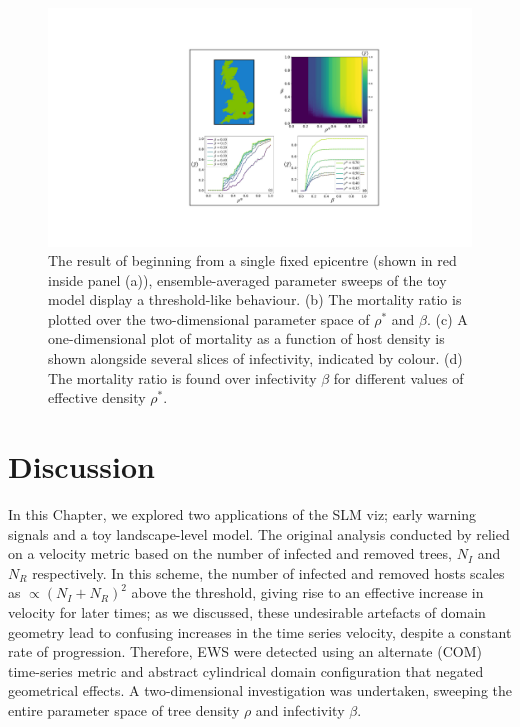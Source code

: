 \begin{figure}
    \centering
    \includegraphics[scale=0.55]{chapter4/figures/figure4-param-sweeps.pdf}
    \caption{
    The result of beginning from a single fixed epicentre (shown in red inside panel (a)),
    ensemble-averaged parameter sweeps of the toy model display a threshold-like behaviour.
    (b) The mortality ratio is plotted over the two-dimensional parameter space of $\rho^*$ and $\beta$. 
    (c) A one-dimensional plot of mortality as a function of host density is shown alongside several slices of infectivity, indicated by colour.
    (d) The mortality ratio is found over infectivity $\beta$ for different values of effective density $\rho^{*}$.
    }
    \label{fig:heterogeneous-phase-space}
\end{figure}

\newpage

\section{Discussion}
\label{sec:ch4-discussion}

In this Chapter, we explored two applications of the SLM viz; early warning signals and a toy landscape-level model.
The original analysis conducted by \cite{OROZCOFUENTES201912} relied on a velocity metric based on the number of 
infected and removed trees, $N_I$ and $N_R$ respectively. In this scheme, the number of infected and removed hosts scales as
$\propto (N_I + N_R)^2$ above the threshold, giving rise to an effective increase in velocity for later times;
as we discussed, these undesirable artefacts of domain geometry lead to confusing increases in the time series velocity, 
despite a constant rate of progression. Therefore, EWS were detected using an alternate (COM) time-series metric and abstract 
cylindrical domain configuration that negated geometrical effects.
A two-dimensional investigation was undertaken, sweeping the entire parameter space of tree density $\rho$ and infectivity $\beta$.

